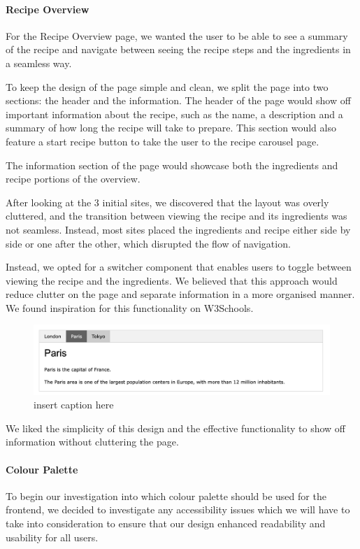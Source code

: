 \documentclass{article}
\begin{document}
\paragraph{Recipe Overview}
For the Recipe Overview page, we wanted the user to be able to see a summary of the recipe and navigate between seeing the recipe steps and the ingredients in a seamless way.

To keep the design of the page simple and clean, we split the page into two sections: the header and the information. The header of the page would show off important information about the recipe, such as the name, a description and a summary of how long the recipe will take to prepare. This section would also feature a start recipe button to take the user to the recipe carousel page.

The information section of the page would showcase both the ingredients and recipe portions of the overview.

After looking at the 3 initial sites, we discovered that the layout was overly cluttered, and the transition between viewing the recipe and its ingredients was not seamless. Instead, most sites placed the ingredients and recipe either side by side or one after the other, which disrupted the flow of navigation.

Instead, we opted for a switcher component that enables users to toggle between viewing the recipe and the ingredients. We believed that this approach would reduce clutter on the page and separate information in a more organised manner. We found inspiration for this functionality on W3Schools.

\begin{figure}[h]
  \includegraphics[width=1.0\textwidth]{assets/W3Schools tabbed component.png}
  \centering
  \caption{insert caption here}
\end{figure}

We liked the simplicity of this design and the effective functionality to show off information without cluttering the page.

\paragraph{Colour Palette}
To begin our investigation into which colour palette should be used for the frontend, we decided to investigate any accessibility issues which we will have to take into consideration to ensure that our design enhanced readability and usability for all users.
\end{document}
